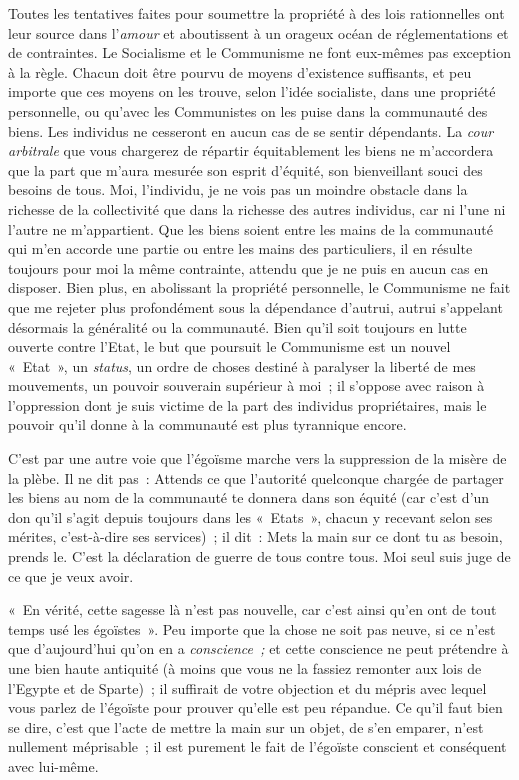 \documentclass[french,twoside]{book} %
\begin{document}
Toutes les tentatives faites pour soumettre la propriété à des lois rationnelles ont leur source dans l’\emph{amour} et aboutissent à un orageux océan de réglementations et de contraintes. Le Socialisme et le Communisme ne font eux-mêmes pas exception à la règle. Chacun doit être pourvu de moyens d’existence suffisants, et peu importe que ces moyens on les trouve, selon  l’idée socialiste, dans une propriété personnelle, ou qu’avec les Communistes on les puise dans la communauté des biens. Les individus ne cesseront en aucun cas de se sentir dépendants. La \emph{cour arbitrale }que vous chargerez de répartir équitablement les biens ne m’accordera que la part que m’aura mesurée son esprit d’équité, son bienveillant souci des besoins de tous. Moi, l’individu, je ne vois pas un moindre obstacle dans la richesse de la collectivité que dans la richesse des autres individus, car ni l’une ni l’autre ne m’appartient. Que les biens soient entre les mains de la communauté qui m’en accorde une partie ou entre les mains des particuliers, il en résulte toujours pour moi la même contrainte, attendu que je ne puis en aucun cas en disposer. Bien plus, en abolissant la propriété personnelle, le Communisme ne fait que me rejeter plus profondément sous la dépendance d’autrui, autrui s’appelant désormais la généralité ou la communauté. Bien qu’il soit toujours en lutte ouverte contre l’Etat, le but que poursuit le Communisme est un nouvel « Etat », un \emph{status}, un ordre de choses destiné à paralyser la liberté de mes mouvements, un pouvoir souverain supérieur à moi ; il s’oppose avec raison à l’oppression dont je suis victime de la part des individus propriétaires, mais le pouvoir qu’il donne à la communauté est plus tyrannique encore.\par
C’est par une autre voie que l’égoïsme marche vers la suppression de la misère de la plèbe. Il ne dit pas : Attends ce que l’autorité quelconque chargée de partager les biens au nom de la communauté te donnera dans son équité (car c’est d’un don qu’il s’agit depuis toujours dans les « Etats », chacun y recevant selon ses mérites, c’est-à-dire ses services) ; il dit : Mets la main sur ce dont tu as besoin, prends le. C’est la déclaration de guerre de tous contre tous. Moi seul suis juge de ce que je veux avoir.\par
« En vérité, cette sagesse là n’est pas nouvelle, car  c’est ainsi qu’en ont de tout temps usé les égoïstes ». Peu importe que la chose ne soit pas neuve, si ce n’est que d’aujourd’hui qu’on en a \emph{conscience ;} et cette conscience ne peut prétendre à une bien haute antiquité (à moins que vous ne la fassiez remonter aux lois de l’Egypte et de Sparte) ; il suffirait de votre objection et du mépris avec lequel vous parlez de l’égoïste pour prouver qu’elle est peu répandue. Ce qu’il faut bien se dire, c’est que l’acte de mettre la main sur un objet, de s’en emparer, n’est nullement méprisable ; il est purement le fait de l’égoïste conscient et conséquent avec lui-même.\par
\end{document}
